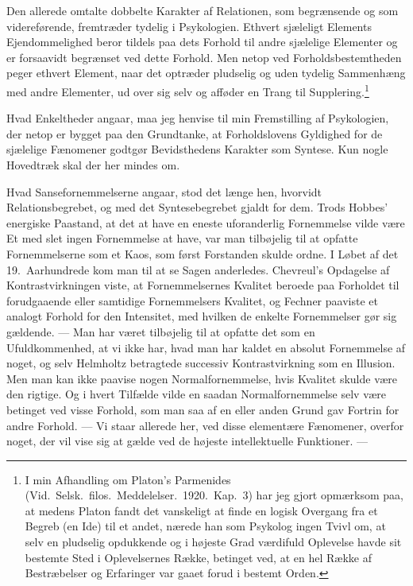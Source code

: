 \documentclass[12pt]{article}
\newcommand{\opage}[1]{\marginnote{\footnotesize\textit{[#1]}}}
\begin{document}
Den allerede omtalte dobbelte Karakter af Relationen, som begrænsende og som
videreførende, fremtræder tydelig i Psykologien. Ethvert sjæleligt Elements
Ejendommelighed beror tildels paa dets Forhold til andre sjælelige Elementer og
er forsaavidt begrænset ved dette Forhold. Men netop ved Forholdsbestemtheden
peger ethvert Element, naar det optræder pludselig og uden tydelig Sammenhæng
med andre Elementer, ud over sig selv og afføder en Trang til
Supplering.\footnote{I min Afhandling om Platon's
  \guillemotright{}Parmenides\guillemotleft{} (Vid.\ Selsk.\ filos.\
  Meddelelser.\ 1920.\ Kap.\ 3) har jeg gjort opmærksom paa, at medens Platon
  fandt det vanskeligt at finde en logisk Overgang fra et Begreb (en Ide) til et
  andet, nærede han som Psykolog ingen Tvivl om, at selv en pludselig
  opdukkende og i højeste Grad værdifuld Oplevelse havde sit bestemte Sted i
  Oplevelsernes Række, betinget ved, at en hel Række af Bestræbelser og
  Erfaringer var gaaet forud i bestemt Orden.}

Hvad Enkeltheder angaar, maa jeg henvise til min Fremstilling af Psykologien,
der netop er bygget paa den
\opage{18} Grundtanke, at Forholdslovens Gyldighed for de sjælelige Fænomener godtgør
Bevidsthedens Karakter som Syntese. Kun nogle Hovedtræk skal der her mindes om.

Hvad Sansefornemmelserne angaar, stod det længe hen, hvorvidt Relationsbegrebet,
og med det Syntesebegrebet gjaldt for dem. Trods Hobbes' energiske Paastand, at
det at have en eneste uforanderlig Fornemmelse vilde være Et med slet ingen
Fornemmelse at have, var man tilbøjelig til at opfatte Fornemmelserne som et
Kaos, som først \guillemotright{}Forstanden\guillemotleft{} skulde ordne. I
Løbet af det 19.\ Aarhundrede kom man til at se Sagen anderledes. Chevreul's
Opdagelse af Kontrastvirkningen viste, at Fornemmelsernes Kvalitet beroede paa
Forholdet til forudgaaende eller samtidige Fornemmelsers Kvalitet, og Fechner
paaviste et analogt Forhold for den Intensitet, med hvilken de enkelte
Fornemmelser gør sig gældende. --- Man har været tilbøjelig til at opfatte det
som en Ufuldkommenhed, at vi ikke har, hvad man har kaldet en
\guillemotright{}absolut\guillemotleft{} Fornemmelse af noget, og selv Helmholtz
betragtede successiv Kontrastvirkning som en Illusion. Men man kan ikke paavise
nogen \guillemotright{}Normalfornemmelse\guillemotleft{}, hvis Kvalitet skulde
være den \guillemotright{}rigtige\guillemotleft{}. Og i hvert Tilfælde vilde en
saadan Normalfornemmelse selv være betinget ved visse Forhold, som man saa af en
eller anden Grund gav Fortrin for andre Forhold. --- Vi staar allerede her, ved
disse elementære Fænomener, overfor noget, der vil vise sig at gælde ved de
højeste intellektuelle Funktioner. ---
\end{document}
